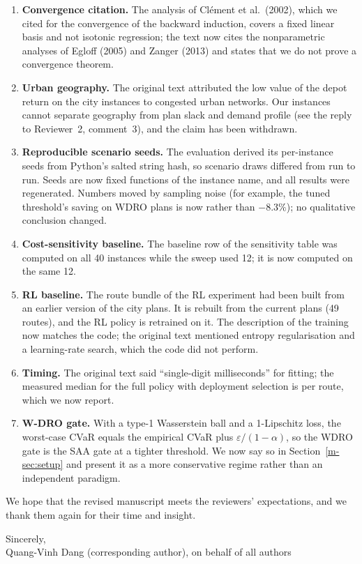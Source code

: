 \documentclass[11pt]{article}
\newcommand{\sref}[1]{Section~\ref{m-#1}}
\begin{document}
\begin{enumerate}[leftmargin=1.4em]
  threshold what Proposition~\ref{m-prop:myopic} proves for the myopic
  break-even rule. The claims are now stated for that rule; a threshold
  tuned on realised cost is not covered.
\item \textbf{Convergence citation.} The analysis of Cl\'ement et al.\
  (2002), which we cited for the convergence of the backward induction,
  covers a fixed linear basis and not isotonic regression; the text now
  cites the nonparametric analyses of Egloff (2005) and Zanger (2013)
  and states that we do not prove a convergence theorem.
\item \textbf{Urban geography.} The original text attributed the low
  value of the depot return on the city instances to congested urban
  networks. Our instances cannot separate geography from plan slack and
  demand profile (see the reply to Reviewer~2, comment~3), and the
  claim has been withdrawn.
\item \textbf{Reproducible scenario seeds.} The evaluation derived its
  per-instance seeds from Python's salted string hash, so scenario draws
  differed from run to run. Seeds are now fixed functions of the
  instance name, and all results were regenerated. Numbers moved by
  sampling noise (for example, the tuned threshold's saving on
  \textsc{WDRO} plans is now \svWDROThresh{} rather than $-8.3\%$); no
  qualitative conclusion changed.
\item \textbf{Cost-sensitivity baseline.} The baseline row of the
  sensitivity table was computed on all 40 instances while the sweep
  used 12; it is now computed on the same 12.
\item \textbf{RL baseline.} The route bundle of the RL experiment had
  been built from an earlier version of the city plans. It is rebuilt
  from the current plans (49 routes), and the RL policy is retrained on
  it. The description of the training now matches the code; the
  original text mentioned entropy regularisation and a learning-rate
  search, which the code did not perform.
\item \textbf{Timing.} The original text said ``single-digit
  milliseconds'' for fitting; the measured median for the full policy
  with deployment selection is \timeBatonMs{} per route, which we now
  report.
\item \textbf{W-DRO gate.} With a type-1 Wasserstein ball and a
  1-Lipschitz loss, the worst-case CVaR equals the empirical CVaR plus
  $\varepsilon/(1-\alpha)$, so the \textsc{WDRO} gate is the
  \textsc{SAA} gate at a tighter threshold. We now say so in
  \sref{sec:setup} and present it as a more conservative regime rather
  than an independent paradigm.
\end{enumerate}

We hope that the revised manuscript meets the reviewers' expectations,
and we thank them again for their time and insight.

\medskip
\noindent Sincerely,\\
Quang-Vinh Dang (corresponding author), on behalf of all authors
\end{document}
